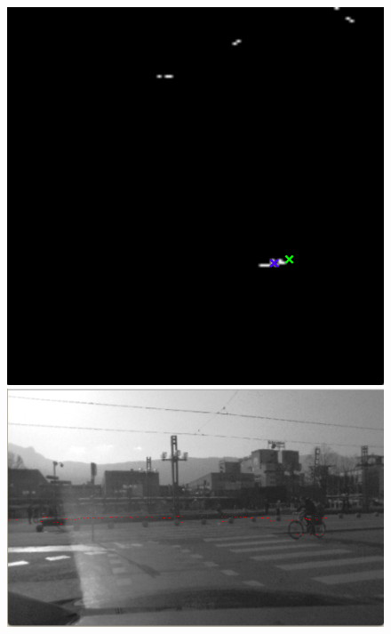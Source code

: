 \documentclass[a4paper,11pt]{article}
\begin{document}
\begin{figure}[H]
    \centering
    \includegraphics[scale=0.3]{pic/tracking1.png}
    \includegraphics[scale=0.4]{pic/tracking1-left.png} \\

\end{figure}
\end{document}
